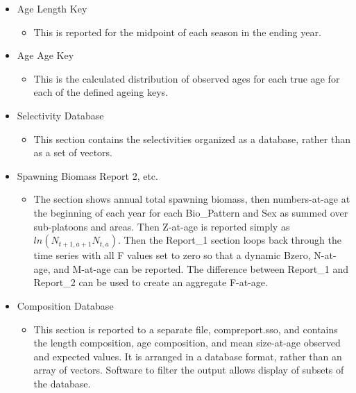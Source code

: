 \begin{itemize}
	\item Age Length Key
	\begin{itemize}
		\item This is reported for the midpoint of each season in the ending year.
	\end{itemize}
	\item Age Age Key
	\begin{itemize}
		\item This is the calculated distribution of observed ages for each true age for each of the defined ageing keys.
	\end{itemize}
	\item Selectivity Database
	\begin{itemize}
		\item This section contains the selectivities organized as a database, rather than as a set of vectors.
	\end{itemize}
	\item Spawning Biomass Report 2, etc.
	\begin{itemize}
		\item The section shows annual total spawning biomass, then numbers-at-age at the beginning of each year for each Bio\_Pattern and Sex as summed over sub-platoons and areas.  Then Z-at-age is reported simply as $ln(N_{t+1,a+1} N_{t,a})$.  Then the Report\_1 section loops back through the time series with all F values set to zero so that a dynamic Bzero, N-at-age, and M-at-age can be reported.  The difference between Report\_1 and Report\_2 can be used to create an aggregate F-at-age.
	\end{itemize}
	\item Composition Database
	\begin{itemize}
		\item This section is reported to a separate file, compreport.sso, and contains the length composition, age composition, and mean size-at-age observed and expected values.  It is arranged in a database format, rather than an array of vectors.  Software to filter the output allows display of subsets of the database.
	\end{itemize}
\end{itemize}
